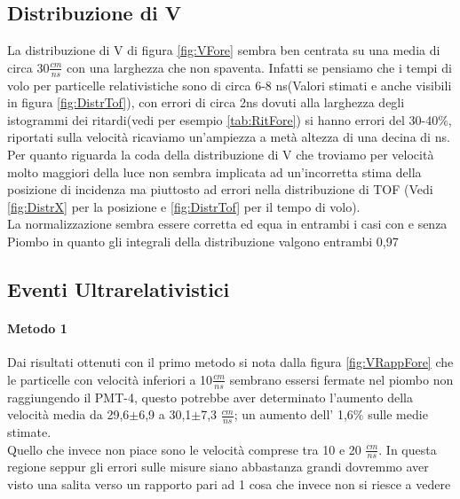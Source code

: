 \documentclass[a4paper]{article}
\begin{document}
\subsection*{Distribuzione di V}
La distribuzione di V di figura \ref{fig:VFore} sembra ben centrata su una media di circa 30$\frac{cm}{ns}$ con una larghezza che non spaventa. Infatti se pensiamo che i tempi di volo per particelle relativistiche sono di circa 6-8 ns(Valori stimati e anche visibili in figura \ref{fig:DistrTof}), con errori di circa 2ns dovuti alla larghezza degli istogrammi dei ritardi(vedi per esempio \ref{tab:RitFore}) si hanno errori del 30-40$\%$, riportati sulla velocità ricaviamo un'ampiezza a metà altezza di una decina di ns. Per quanto riguarda la coda della distribuzione di V che troviamo per velocità molto maggiori della luce non sembra implicata ad un'incorretta stima della posizione di incidenza ma piuttosto ad errori nella distribuzione di TOF (Vedi \ref{fig:DistrX} per la posizione e \ref{fig:DistrTof} per il tempo di volo).\\
La normalizzazione sembra essere corretta ed equa in entrambi i casi con e senza Piombo in quanto gli integrali della distribuzione valgono entrambi 0,97
\subsection*{Eventi Ultrarelativistici}
\paragraph{Metodo 1}
Dai risultati ottenuti con il primo metodo si nota dalla figura \ref{fig:VRappFore} che le particelle con velocità inferiori a 10$\frac{cm}{ns}$ sembrano essersi fermate nel piombo non raggiungendo il PMT-4, questo potrebbe aver determinato l'aumento della velocità media da 29,6$\pm$6,9 a 30,1$\pm$7,3 $\frac{cm}{ns}$; un aumento dell' 1,6$\%$ sulle medie stimate.\\
Quello che invece non piace sono le velocità comprese tra 10 e 20 $\frac{cm}{ns}$. In questa regione seppur gli errori sulle misure siano abbastanza grandi dovremmo aver visto una salita verso un rapporto pari ad 1 cosa che invece non si riesce a vedere
\end{document}
